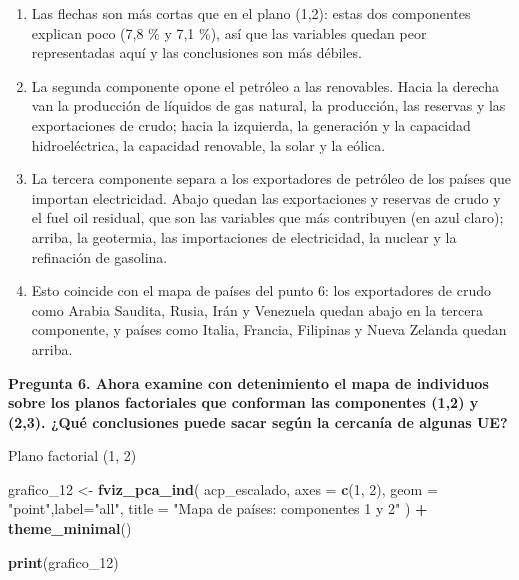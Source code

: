 \documentclass[
]{article}
\newenvironment{Shaded}{\begin{snugshade}}{\end{snugshade}}
\newcommand{\AttributeTok}[1]{\textcolor[rgb]{0.13,0.29,0.53}{#1}}
\newcommand{\DecValTok}[1]{\textcolor[rgb]{0.00,0.00,0.81}{#1}}
\newcommand{\FunctionTok}[1]{\textcolor[rgb]{0.13,0.29,0.53}{\textbf{#1}}}
\newcommand{\NormalTok}[1]{#1}
\newcommand{\OtherTok}[1]{\textcolor[rgb]{0.56,0.35,0.01}{#1}}
\newcommand{\SpecialCharTok}[1]{\textcolor[rgb]{0.81,0.36,0.00}{\textbf{#1}}}
\newcommand{\StringTok}[1]{\textcolor[rgb]{0.31,0.60,0.02}{#1}}
\providecommand{\tightlist}{%
  \setlength{\itemsep}{0pt}\setlength{\parskip}{0pt}}
\begin{document}
\begin{enumerate}
\def\labelenumi{\arabic{enumi}.}
\tightlist
\item
  Las flechas son más cortas que en el plano (1,2): estas dos
  componentes explican poco (7,8 \% y 7,1 \%), así que las variables
  quedan peor representadas aquí y las conclusiones son más débiles.
\item
  La segunda componente opone el petróleo a las renovables. Hacia la
  derecha van la producción de líquidos de gas natural, la producción,
  las reservas y las exportaciones de crudo; hacia la izquierda, la
  generación y la capacidad hidroeléctrica, la capacidad renovable, la
  solar y la eólica.
\item
  La tercera componente separa a los exportadores de petróleo de los
  países que importan electricidad. Abajo quedan las exportaciones y
  reservas de crudo y el fuel oil residual, que son las variables que
  más contribuyen (en azul claro); arriba, la geotermia, las
  importaciones de electricidad, la nuclear y la refinación de gasolina.
\item
  Esto coincide con el mapa de países del punto 6: los exportadores de
  crudo como Arabia Saudita, Rusia, Irán y Venezuela quedan abajo en la
  tercera componente, y países como Italia, Francia, Filipinas y Nueva
  Zelanda quedan arriba.
\end{enumerate}

\noindent\textbf{Pregunta 6. Ahora examine con detenimiento el mapa de individuos sobre los planos factoriales que conforman las componentes (1,2) y (2,3). ¿Qué conclusiones puede sacar según la cercanía de algunas UE?}

Plano factorial (1, 2)

\begin{Shaded}
\begin{Highlighting}[]
\NormalTok{grafico\_12 }\OtherTok{\textless{}{-}} \FunctionTok{fviz\_pca\_ind}\NormalTok{(}
\NormalTok{  acp\_escalado,}
  \AttributeTok{axes =} \FunctionTok{c}\NormalTok{(}\DecValTok{1}\NormalTok{, }\DecValTok{2}\NormalTok{),}
  \AttributeTok{geom =} \StringTok{"point"}\NormalTok{,}\AttributeTok{label=}\StringTok{"all"}\NormalTok{,}
  \AttributeTok{title =} \StringTok{"Mapa de países: componentes 1 y 2"}
\NormalTok{) }\SpecialCharTok{+}
  \FunctionTok{theme\_minimal}\NormalTok{()}

\FunctionTok{print}\NormalTok{(grafico\_12)}
\end{Highlighting}
\end{Shaded}
\end{document}
